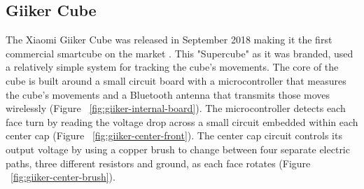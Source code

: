 \subsection{Giiker Cube}
The Xiaomi Giiker Cube was released in September 2018 making it the first commercial smartcube on the market \cite{giiker-thecubicle}.
This "Supercube" as it was branded, used a relatively simple system for tracking the cube's movements.
The core of the cube is built around a small circuit board with a microcontroller that measures the cube's movements and a Bluetooth antenna that transmits those moves wirelessly (Figure ~\ref{fig:giiker-internal-board}).
The microcontroller detects each face turn by reading the voltage drop across a small circuit embedded within each center cap (Figure ~\ref{fig:giiker-center-front}).
The center cap circuit controls its output voltage by using a copper brush to change between four separate electric paths, three different resistors and ground, as each face rotates (Figure ~\ref{fig:giiker-center-brush}). \cite{giiker-internals}

